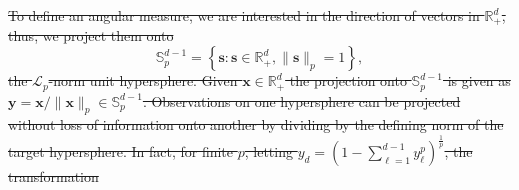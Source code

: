 \documentclass[iicol,sn-basic]{sn-jnl}
\theoremstyle{thmstyleone}
\begin{document}
\st{To define an angular measure,  we are interested in the direction of vectors in ${\mathbb R}_{+}^d$, thus, we project them onto}
\begin{equation*}
{\mathbb S}_{p}^{d-1} = \left\lbrace \bm{s} : \bm{s} \in {\mathbb R}_{+}^{d}, \lVert \bm{s}\rVert_{p} = 1\right\rbrace,
\end{equation*}
\st{the $\mathcal{L}_p$-norm unit hypersphere.  Given $\bm{x}\in {\mathbb R}^d_+$ the projection onto ${\mathbb S}_{p}^{d-1}$ is given as $\bm{y} = \bm{x} / \lVert \bm{x}\rVert_p \in {\mathbb S}_{p}^{d-1}$. Observations on one hypersphere can be projected without loss of information onto another by dividing by the defining norm of the target hypersphere. In fact, for finite $p$, letting $y_d = \left(1 - {\textstyle\sum}_{\ell = 1}^{d-1}y_{\ell}^p\right)^{\frac{1}{p}}$, the transformation}
\end{document}

